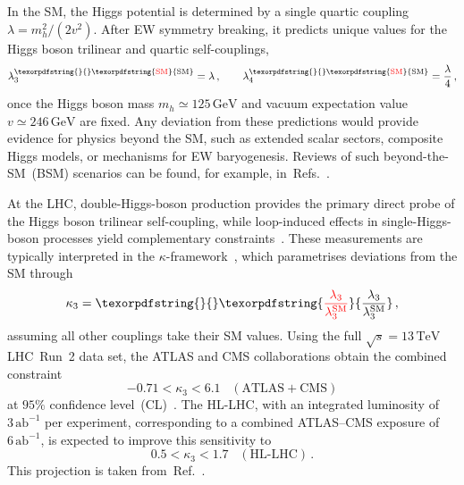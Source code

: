 \documentclass{SciPost}
\def\beq{\begin{equation}}
\def\eeq{\end{equation}}
\providecommand{\DIFaddtex}[1]{{\protect\color{red} #1}} %
\providecommand{\DIFdeltex}[1]{} %
\providecommand{\DIFaddbegin}{} %
\providecommand{\DIFaddend}{} %
\providecommand{\DIFdelbegin}{} %
\providecommand{\DIFdelend}{} %
\providecommand{\DIFadd}[1]{\texorpdfstring{\DIFaddtex{#1}}{#1}} %
\providecommand{\DIFdel}[1]{\texorpdfstring{\DIFdeltex{#1}}{}} %
\begin{document}
In the SM, the Higgs potential is determined by a single quartic coupling $\lambda = m_h^2/(2v^2)$. After EW symmetry breaking, it predicts unique values for the Higgs \DIFaddbegin \DIFadd{boson }\DIFaddend trilinear and quartic self-couplings,
\beq \label{eq:SM67}
\lambda_3^{\DIFdelbegin %
\DIFdel{SM}\DIFdelend \DIFaddbegin \DIFadd{\mathrm{SM}}\DIFaddend } = \lambda \,, \qquad
\lambda_4^{\DIFdelbegin %
\DIFdel{SM}\DIFdelend \DIFaddbegin \DIFadd{\mathrm{SM}}\DIFaddend } = \frac{\lambda}{4} \,,
\eeq
once the Higgs boson mass $m_h\simeq125\,\mathrm{GeV}$ and vacuum expectation value $v\simeq246\,\mathrm{GeV}$ are fixed. Any deviation from these predictions would provide evidence for physics beyond the SM, such as extended scalar sectors, composite Higgs models, or mechanisms for EW baryogenesis. Reviews of such beyond-the-SM~(BSM) scenarios can be found, for example, in~Refs.~\cite{DiMicco:2019ngk,Durieux:2022hbu}.

At the LHC, \DIFdelbegin \DIFdel{double-Higgs }\DIFdelend \DIFaddbegin \DIFadd{double-Higgs-boson }\DIFaddend production provides the primary direct probe of the Higgs \DIFaddbegin \DIFadd{boson }\DIFaddend trilinear self-coupling, while loop-induced effects in \DIFdelbegin \DIFdel{single-Higgs }\DIFdelend \DIFaddbegin \DIFadd{single-Higgs-boson }\DIFaddend processes yield complementary constraints~\cite{Gorbahn:2016uoy,Degrassi:2016wml,Bizon:2016wgr,Maltoni:2017ims,Gorbahn:2019lwq,Haisch:2021hvy,Gao:2023bll,Haisch:2024nzv,Ghosh:2025fma}. These measurements are typically interpreted in the $\kappa$-framework~\cite{LHCHiggsCrossSectionWorkingGroup:2012nn,LHCHiggsCrossSectionWorkingGroup:2013rie,LHCHiggsCrossSectionWorkingGroup:2016ypw}, which parametrises deviations from the SM through
\beq \label{eq:kappa3}
\kappa_3 = \DIFdelbegin \DIFdel{\frac{\lambda_3}{\lambda_3^{\rm SM}} }\DIFdelend \DIFaddbegin \DIFadd{\frac{\lambda_3}{\lambda_3^{\mathrm{SM}}} }\DIFaddend \,,
\eeq
assuming all other couplings take their SM values. Using the full $\sqrt{s}=13\,\mathrm{TeV}$ LHC~Run~2 data set, the ATLAS and CMS collaborations obtain the combined constraint
\beq \label{eq:kappa3bound}
-0.71 < \kappa_3 < 6.1\;\;\;(\text{ATLAS}+\text{CMS})
\eeq
at \DIFdelbegin \DIFdel{the }\DIFdelend $95\%$ confidence level~(CL)~\cite{CMS:2026nuu}. The HL-LHC, with an integrated luminosity of \DIFaddbegin \DIFadd{$3\,\mathrm{ab}^{-1}$ per experiment, corresponding to a combined ATLAS--CMS exposure of }\DIFaddend $6\,\mathrm{ab}^{-1}$, is expected to improve this sensitivity to
\beq
0.5 < \kappa_3 < 1.7\;\;\;(\text{HL-LHC})\,.
\eeq
\DIFaddbegin \DIFadd{This projection is taken from~Ref.~\cite{ATL-PHYS-PUB-2025-018}.
}\DIFaddend
\end{document}
